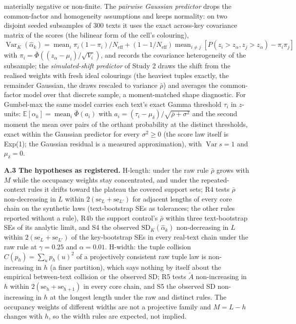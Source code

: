 \documentclass[11pt,letterpaper]{article}
\begin{document}
materially negative or non-finite. The \emph{pairwise Gaussian predictor} drops the common-factor and homogeneity assumptions and keeps normality: on two disjoint seeded subsamples of 300 texts it uses the exact across-key covariance matrix of the scores (the bilinear form of the cell's colouring), \(\operatorname{Var}_K(\hat\alpha_k) = \operatorname{mean}_i \pi_i(1-\pi_i)/N_{\mathrm{eff}} + (1 - 1/N_{\mathrm{eff}})\operatorname{mean}_{i\ne j}[P(z_i > z_\alpha, z_j > z_\alpha) - \pi_i\pi_j]\) with \(\pi_i = \bar\Phi((z_\alpha - \mu_i)/\sqrt{V_i})\), and records the covariance heterogeneity of the subsample; the \emph{simulated-shift predictor} of Study 2 draws the shift from the realised weights with fresh ideal colourings (the heaviest tuples exactly, the remainder Gaussian, the draws rescaled to variance \(\bar\rho\)) and averages the common-factor model over that discrete sample, a moment-matched shape diagnostic. For Gumbel-max the same model carries each text's exact Gamma threshold \(\tau_i\) in \(z\)-units: \(\mathbb{E}[\alpha_k] = \operatorname{mean}_i \bar\Phi(a_i)\) with \(a_i = (\tau_i - \mu_\delta)/\sqrt{\bar\rho + \sigma^2}\) and the second moment the mean over pairs of the orthant probability at the distinct thresholds, exact within the Gaussian predictor for every \(\sigma^2 \ge 0\) (the score law itself is Exp(1); the Gaussian residual is a measured approximation), with \(\operatorname{Var} s = 1\) and \(\mu_\delta = 0\).

\textbf{A.3 The hypotheses as registered.} H-length: under the raw rule \(\bar\rho\) grows with \(M\) while the occupancy weights stay concentrated, and under the repeated-context rules it drifts toward the plateau the covered support sets; R4 tests \(\bar\rho\) non-decreasing in \(L\) within \(2(\mathrm{se}_L + \mathrm{se}_{L'})\) for adjacent lengths of every core chain on the synthetic laws (text-bootstrap SEs as tolerances; the other rules reported without a rule), R4b the support control's \(\bar\rho\) within three text-bootstrap SEs of its analytic limit, and S4 the observed \(\mathrm{SD}_K(\hat\alpha_k)\) non-decreasing in \(L\) within \(2(\mathrm{se}_L + \mathrm{se}_{L'})\) of the key-bootstrap SEs in every real-text chain under the raw rule at \(\gamma = 0.25\) and \(\alpha = 0.01\). H-width: the tuple collision \(C(p_h) = \sum_u p_h(u)^2\) of a projectively consistent raw tuple law is non-increasing in \(h\) (a finer partition), which says nothing by itself about the empirical between-text collision or the observed SD; R5 tests \(\tilde A\) non-increasing in \(h\) within \(2(\mathrm{se}_h + \mathrm{se}_{h+1})\) in every core chain, and S5 the observed SD non-increasing in \(h\) at the longest length under the raw and distinct rules. The occupancy weights of different widths are not a projective family and \(M = L - h\) changes with \(h\), so the width rules are expected, not implied.
\end{document}
